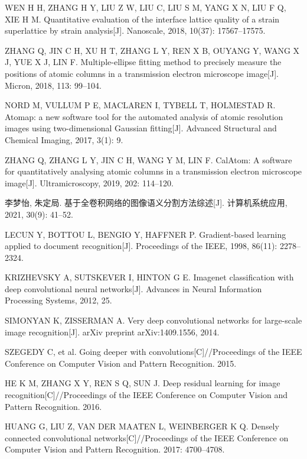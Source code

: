 WEN H H, ZHANG H Y, LIU Z W, LIU C, LIU S M, YANG X N, LIU F Q, XIE H M. Quantitative evaluation of the interface lattice quality of a strain superlattice by strain analysis[J]. Nanoscale, 2018, 10(37): 17567--17575.

ZHANG Q, JIN C H, XU H T, ZHANG L Y, REN X B, OUYANG Y, WANG X J, YUE X J, LIN F. Multiple-ellipse fitting method to precisely measure the positions of atomic columns in a transmission electron microscope image[J]. Micron, 2018, 113: 99--104.

NORD M, VULLUM P E, MACLAREN I, TYBELL T, HOLMESTAD R. Atomap: a new software tool for the automated analysis of atomic resolution images using two-dimensional Gaussian fitting[J]. Advanced Structural and Chemical Imaging, 2017, 3(1): 9.

ZHANG Q, ZHANG L Y, JIN C H, WANG Y M, LIN F. CalAtom: A software for quantitatively analysing atomic columns in a transmission electron microscope image[J]. Ultramicroscopy, 2019, 202: 114--120.

李梦怡, 朱定局. 基于全卷积网络的图像语义分割方法综述[J]. 计算机系统应用, 2021, 30(9): 41--52.

LECUN Y, BOTTOU L, BENGIO Y, HAFFNER P. Gradient-based learning applied to document recognition[J]. Proceedings of the IEEE, 1998, 86(11): 2278--2324.

KRIZHEVSKY A, SUTSKEVER I, HINTON G E. Imagenet classification with deep convolutional neural networks[J]. Advances in Neural Information Processing Systems, 2012, 25.

SIMONYAN K, ZISSERMAN A. Very deep convolutional networks for large-scale image recognition[J]. arXiv preprint arXiv:1409.1556, 2014.

SZEGEDY C, et al. Going deeper with convolutions[C]//Proceedings of the IEEE Conference on Computer Vision and Pattern Recognition. 2015.

HE K M, ZHANG X Y, REN S Q, SUN J. Deep residual learning for image recognition[C]//Proceedings of the IEEE Conference on Computer Vision and Pattern Recognition. 2016.

HUANG G, LIU Z, VAN DER MAATEN L, WEINBERGER K Q. Densely connected convolutional networks[C]//Proceedings of the IEEE Conference on Computer Vision and Pattern Recognition. 2017: 4700--4708.

